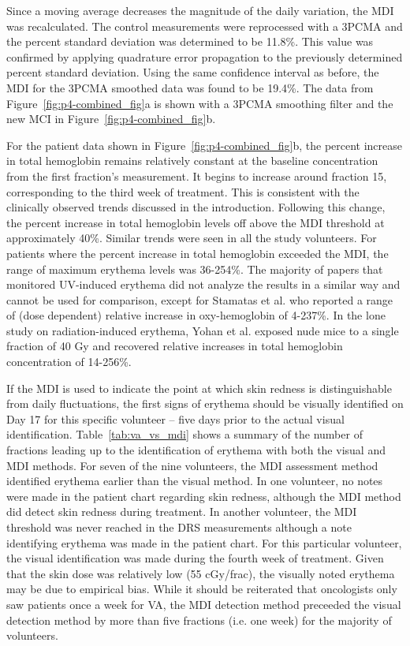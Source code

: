 Since a moving average decreases the magnitude of the daily variation, the MDI was recalculated. The control measurements were reprocessed with a 3PCMA and the percent standard deviation was determined to be 11.8\%. This value was confirmed by applying quadrature error propagation to the previously determined percent standard deviation. Using the same confidence interval as before, the MDI for the 3PCMA smoothed data was found to be 19.4\%. The data from Figure~\ref{fig:p4-combined_fig}a is shown with a 3PCMA smoothing filter and the new MCI in Figure~\ref{fig:p4-combined_fig}b.

For the patient data shown in Figure~\ref{fig:p4-combined_fig}b, the percent increase in total hemoglobin remains relatively constant at the baseline concentration from the first fraction’s measurement. It begins to increase around fraction 15, corresponding to the third week of treatment. This is consistent with the clinically observed trends discussed in the introduction. Following this change, the percent increase in total hemoglobin levels off above the MDI threshold at approximately 40\%. Similar trends were seen in all the study volunteers. For patients where the percent increase in total hemoglobin exceeded the MDI, the range of maximum erythema levels was 36-254\%. The majority of papers that monitored UV-induced erythema did not analyze the results in a similar way and cannot be used for comparison,\cite{Harrison2002,Wagner2002,Wong2010} except for Stamatas et al.\cite{Stamatas2008} who reported a range of (dose dependent) relative increase in oxy-hemoglobin of 4-237\%. In the lone study on radiation-induced erythema, Yohan et al.\cite{Yohan2014} exposed nude mice to a single fraction of 40 Gy and recovered relative increases in total hemoglobin concentration of 14-256\%.

If the MDI is used to indicate the point at which skin redness is distinguishable from daily fluctuations, the first signs of erythema should be visually identified on Day 17 for this specific volunteer – five days prior to the actual visual identification. Table~\ref{tab:va_vs_mdi} shows a summary of the number of fractions leading up to the identification of erythema with both the visual and MDI methods. For seven of the nine volunteers, the MDI assessment method identified erythema earlier than the visual method. In one volunteer, no notes were made in the patient chart regarding skin redness, although the MDI method did detect skin redness during treatment. In another volunteer, the MDI threshold was never reached in the DRS measurements although a note identifying erythema was made in the patient chart. For this particular volunteer, the visual identification was made during the fourth week of treatment. Given that the skin dose was relatively low (55 cGy/frac), the visually noted erythema may be due to empirical bias. While it should be reiterated that oncologists only saw patients once a week for VA, the MDI detection method preceeded the visual detection method by more than five fractions (i.e. one week) for the majority of volunteers.

